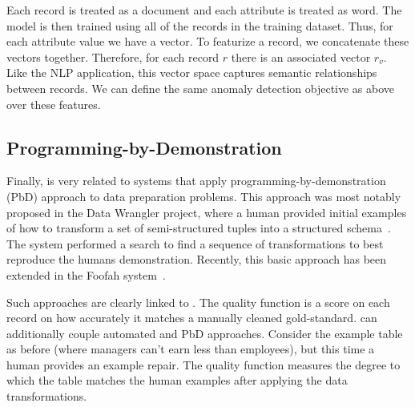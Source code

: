 Each record is treated as a document and each attribute is treated as word.
 The model is then trained using all of the records in the training dataset.
 Thus, for each attribute value we have a vector.
 To featurize a record, we concatenate these vectors together.
 Therefore, for each record $r$ there is an associated vector $r_v$.
  Like the NLP application, this vector space captures semantic relationships between records.
  We can define the same anomaly detection objective as above over these features.
  
\subsection{Programming-by-Demonstration}
Finally, \sys is very related to systems that apply programming-by-demonstration (PbD) approach to data preparation problems.
This approach was most notably proposed in the Data Wrangler project, where a human provided initial examples of how to transform a set of semi-structured tuples into a structured schema~\cite{wrangler,trifacta}.
The system performed a search to find a sequence of transformations to best reproduce the humans demonstration.
Recently, this basic approach has been extended in the Foofah system~\cite{jin2017foofah}.

Such approaches are clearly linked to \sys. The quality function is a score on each record on how accurately it matches a manually cleaned gold-standard. \sys can additionally couple automated and PbD approaches. 
Consider the example table as before (where managers can't earn less than employees), but this time  a human provides an example repair.
The quality function measures the degree to which the table matches the human examples after applying the data transformations.








